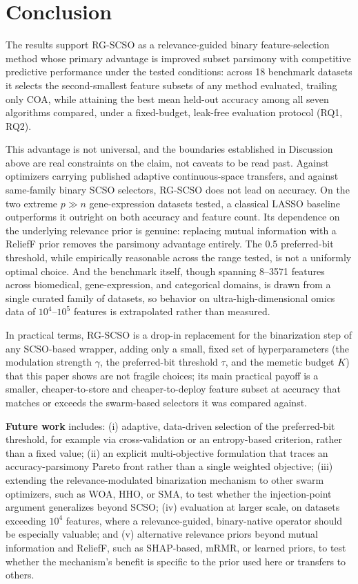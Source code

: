 \documentclass[iicol,sn-basic,pdflatex]{sn-jnl}
\begin{document}
\FloatBarrier
\section{Conclusion}
The results support RG-SCSO as a relevance-guided binary
feature-selection method whose primary advantage is improved subset
parsimony with competitive predictive performance under the tested
conditions: across 18 benchmark datasets it selects the
second-smallest feature subsets of any method evaluated, trailing only COA,
while attaining the best mean held-out accuracy among all seven algorithms
compared, under a fixed-budget, leak-free evaluation protocol
(RQ1, RQ2).

This advantage is not universal, and the boundaries established in
Discussion above are real constraints on the claim, not caveats to be
read past. Against optimizers carrying published adaptive continuous-space
transfers, and against same-family binary SCSO selectors, RG-SCSO does not
lead on accuracy. On the two extreme $p\gg n$ gene-expression datasets tested,
a classical LASSO baseline outperforms it outright on both accuracy and
feature count. Its dependence on the underlying relevance prior is genuine:
replacing mutual information with a ReliefF prior removes the parsimony
advantage entirely. The 0.5 preferred-bit threshold, while empirically
reasonable across the range tested, is not a uniformly optimal choice. And the
benchmark itself, though spanning 8--3571 features across
biomedical, gene-expression, and categorical domains, is drawn from a single
curated family of datasets, so behavior on ultra-high-dimensional omics data
of $10^4$--$10^5$ features is extrapolated rather than measured.

In practical terms, RG-SCSO is a drop-in replacement for the binarization
step of any SCSO-based wrapper, adding only a small, fixed set of
hyperparameters (the modulation strength $\gamma$, the preferred-bit
threshold $\tau$, and the memetic budget $K$) that this paper shows are
not fragile choices; its main practical payoff is a smaller,
cheaper-to-store and cheaper-to-deploy feature subset at accuracy that
matches or exceeds the swarm-based selectors it was compared against.

\textbf{Future work} includes: (i) adaptive, data-driven selection of the
preferred-bit threshold, for example via cross-validation or an
entropy-based criterion, rather than a fixed value; (ii) an explicit
multi-objective formulation that traces an accuracy-parsimony Pareto front
rather than a single weighted objective; (iii) extending the
relevance-modulated binarization mechanism to other swarm optimizers, such
as WOA, HHO, or SMA, to test whether the injection-point argument
generalizes beyond SCSO; (iv) evaluation at larger scale, on datasets
exceeding $10^4$ features, where a relevance-guided, binary-native operator
should be especially valuable; and (v) alternative relevance priors beyond
mutual information and ReliefF, such as SHAP-based, mRMR, or learned
priors, to test whether the mechanism's benefit is specific to the prior
used here or transfers to others.
\end{document}
